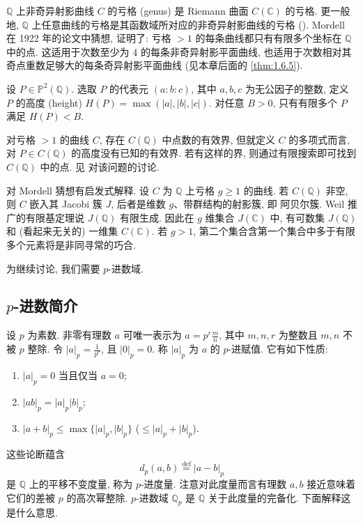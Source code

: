 $\mathbb{Q}$ 上非奇异射影曲线 $C$ 的亏格 (genus) 是 Riemann 曲面 $C(\mathbb{C})$ 的亏格. 更一般地, $\mathbb{Q}$ 上任意曲线的亏格是其函数域所对应的非奇异射影曲线的亏格 (\cite[\S7.5, Cor.\ to Theorem 3]{fulton1969}). Mordell 在 1922 年的论文中猜想, \cite{faltings1983} 证明了: 亏格 $> 1$ 的每条曲线都只有有限多个坐标在 $\mathbb{Q}$ 中的点. 这适用于次数至少为 $4$ 的每条非奇异射影平面曲线, 也适用于次数相对其奇点重数足够大的每条奇异射影平面曲线 (见本章后面的 \ref{thm:1.6.5}).

\begin{remark} \label{thm:1.2.3} 
设 $P\in\mathbb{P}^2(\mathbb{Q})$. 选取 $P$ 的代表元 $(a:b:c)$, 其中 $a,b,c$ 为无公因子的整数, 定义 $P$ 的高度 (height) $H(P) = \max(|a|,|b|,|c|)$. 对任意 $B > 0$, 只有有限多个 $P$ 满足 $H(P) < B$.

对亏格 $> 1$ 的曲线 $C$, 存在 $C(\mathbb{Q})$ 中点数的有效界, 但就定义 $C$ 的多项式而言, 对 $P\in C(\mathbb{Q})$ 的高度没有已知的有效界. 若有这样的界, 则通过有限搜索即可找到 $C(\mathbb{Q})$ 中的点. 见 \cite[F.4.2]{hindry2000} 对该问题的讨论.
\end{remark}

\begin{aside} \label{thm:1.2.4} 
对 Mordell 猜想有启发式解释. 设 $C$ 为 $\mathbb{Q}$ 上亏格 $g\ge 1$ 的曲线. 若 $C(\mathbb{Q})$ 非空, 则 $C$ 嵌入其 Jacobi 簇 $J$, 后者是维数 $g$、带群结构的射影簇, 即 阿贝尔簇. Weil 推广的有限基定理说 $J(\mathbb{Q})$ 有限生成. 因此在 $g$ 维集合 $J(\mathbb{C})$ 中, 有可数集 $J(\mathbb{Q})$ 和 (看起来无关的) 一维集 $C(\mathbb{C})$. 若 $g > 1$, 第二个集合含第一个集合中多于有限多个元素将是非同寻常的巧合.
\end{aside}

为继续讨论, 我们需要 $p$-进数域.

\subsection*{$p$-进数简介}

设 $p$ 为素数. 非零有理数 $a$ 可唯一表示为 $a = p^r\frac{m}{n}$, 其中 $m, n, r$ 为整数且 $m, n$ 不被 $p$ 整除. 令 $|a|_p = \frac{1}{p^r}$, 且 $|0|_p = 0$. 称 $|a|_p$ 为 $a$ 的 $p$-进赋值. 它有如下性质:
\begin{enumerate}[label=\textup{(\alph*)}]
\item $|a|_p = 0$ 当且仅当 $a = 0$;
\item $|ab|_p = |a|_p|b|_p$;
\item $|a+b|_p\le\max\{|a|_p,|b|_p\}$ ($\le |a|_p + |b|_p$).
\end{enumerate}
这些论断蕴含
\[
d_p(a,b) \overset{\text{def}}{=} |a-b|_p
\]
是 $\mathbb{Q}$ 上的平移不变度量, 称为 $p$-进度量. 注意对此度量而言有理数 $a, b$ 接近意味着它们的差被 $p$ 的高次幂整除. $p$-进数域 $\mathbb{Q}_p$ 是 $\mathbb{Q}$ 关于此度量的完备化. 下面解释这是什么意思.

